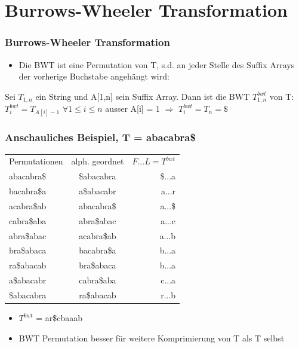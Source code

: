 \documentclass{beamer}
\begin{document}
\section{Burrows-Wheeler Transformation}
\begin{frame}
\frametitle{Burrows-Wheeler Transformation}
\begin{itemize}
\item Die BWT ist eine Permutation von T, s.d. an jeder Stelle des Suffix Arrays der vorherige Buchstabe angehängt wird:
\end{itemize}
\begin{Definition}
Sei $T_{1,n}$ ein String und A[1,n] sein Suffix Array. Dann ist die BWT $T_{1,n}^{bwt}$ von T: \newline $T_{i}^{bwt} = T_{A[i]-1}$ $\forall 1 \leq i \leq n$ ausser A[i] = 1 $\Rightarrow$ $T_{i}^{bwt} = T_n = \$ $
\end{Definition}
\end{frame}
\begin{frame}
\frametitle{Anschauliches Beispiel, T = \glqq abacabra\$\grqq}
\begin{tabular}{l c r}
Permutationen & alph. geordnet & $F...L = T^{bwt}$ \\
abacabra\$ & \$abacabra & \$...a \\
bacabra\$a & a\$abacabr & a...r \\
acabra\$ab & abacabra\$ & a...\$ \\
cabra\$aba & abra\$abac & a...c \\
abra\$abac & acabra\$ab & a...b \\
bra\$abaca & bacabra\$a & b...a \\
ra\$abacab & bra\$abaca & b...a \\
a\$abacabr & cabra\$aba & c...a \\
\$abacabra & ra\$abacab & r...b \\
\end{tabular}
\begin{itemize}
\item $T^{bwt}$ = ar\$cbaaab
\item BWT Permutation besser für weitere Komprimierung von T als T selbst
\end{itemize}
\end{frame}
\end{document}
